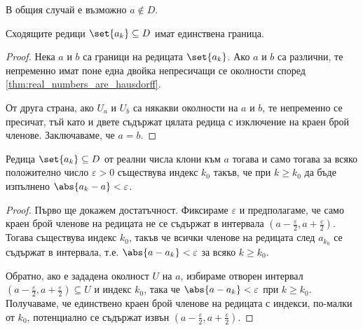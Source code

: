 \documentclass{../../common/topic}
\begin{document}
\begin{remark}
  В общия случай е възможно \( a \not\in D \).
\end{remark}

\begin{proposition}
  Сходящите редици \( \set{ a_k } \subseteq D \) имат единствена граница.
\end{proposition}
\begin{proof}
  Нека \( a \) и \( b \) са граници на редицата \( \set{ a_k } \). Ако \( a \) и \( b \) са различни, те непременно имат поне една двойка непресичащи се околности според \cref{thm:real_numbers_are_hausdorff}.

  От друга страна, ако \( U_a \) и \( U_b \) са някакви околности на \( a \) и \( b \), те непременно се пресичат, тъй като и двете съдържат цялата редица с изключение на краен брой членове. Заключаваме, че \( a = b \).
\end{proof}

\begin{proposition}\label{thm:sequence_converges_in_topology_iff_converges_in_base}
  Редица \( \set{ a_k } \subseteq D \) от реални числа клони към \( a \) тогава и само тогава за всяко положително число \( \varepsilon > 0 \) съществува индекс \( k_0 \) такъв, че при \( k \geq k_0 \) да бъде изпълнено \( \abs{a_k - a} < \varepsilon \).
\end{proposition}
\begin{proof}
  Първо ще докажем достатъчност. Фиксираме \( \varepsilon \) и предполагаме, че само краен брой членове на редицата не се съдържат в интервала \( (a - \tfrac{\varepsilon} 2, a + \tfrac{\varepsilon} 2) \). Тогава съществува индекс \( k_0 \), такъв че всички членове на редицата след \( a_{k_0} \) се съдържат в интервала, т.е. \( \abs{a - a_k} < \varepsilon \) за всяко \( k \geq k_0 \).

  Обратно, ако е зададена околност \( U \) на \( a \), избираме отворен интервал \( (a - \tfrac \varepsilon 2, a + \tfrac \varepsilon 2) \subseteq U \) и индекс \( k_0 \), така че \( \abs{a - a_k} < \varepsilon \) при \( k \geq k_0 \). Получаваме, че единствено краен брой членове на редицата с индекси, по-малки от \( k_0 \), потенциално се съдържат извън \( (a - \tfrac \varepsilon 2, a + \tfrac \varepsilon 2) \).
\end{proof}
\end{document}
